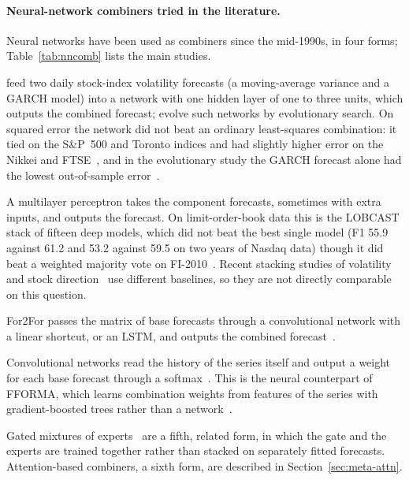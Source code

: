 \paragraph{Neural-network combiners tried in the literature.} Neural networks have been used as combiners
since the mid-1990s, in four forms; Table~\ref{tab:nncomb} lists the main studies.
\begin{description}[leftmargin=1.5em,style=nextline,itemsep=2pt]
\item[A small network on the forecasts alone] \citet{donaldson1996annc} feed two daily stock-index volatility
  forecasts (a moving-average variance and a GARCH model) into a network with one hidden layer of one to
  three units, which outputs the combined forecast; \citet{harrald1997} evolve such networks by evolutionary
  search. On squared error the network did not beat an ordinary least-squares combination: it tied on the
  S\&P~500 and Toronto indices and had slightly higher error on the Nikkei and FTSE~\citep{donaldson1996annc}, and
  in the evolutionary study the GARCH forecast alone had the lowest out-of-sample error~\citep{harrald1997}.
\item[A feed-forward stacker] A multilayer perceptron takes the component forecasts, sometimes with extra
  inputs, and outputs the forecast. On limit-order-book data this is the LOBCAST stack of fifteen deep
  models, which did not beat the best single model (F1 55.9 against 61.2 and 53.2 against 59.5 on two years of
  Nasdaq data) though it did beat a weighted majority vote on FI-2010~\citep{prata2024}. Recent stacking
  studies of volatility and stock direction~\citep{ramosperez2019,barnwal2019stack} use different
  baselines, so they are not directly comparable on this question.
\item[A network that reads the forecasts as a sequence or image] For2For passes the matrix of base forecasts
  through a convolutional network with a linear shortcut, or an LSTM, and outputs the combined
  forecast~\citep{zhao2020for2for}.
\item[A network that outputs weights from the raw series] Convolutional networks read the history of the
  series itself and output a weight for each base forecast through a softmax~\citep{mafildes2021,felici2026mtl}.
  This is the neural counterpart of FFORMA, which learns combination weights from features of the series with
  gradient-boosted trees rather than a network~\citep{montero2020fforma}.
\end{description}
Gated mixtures of experts~\citep{jacobs1991,guo2018btcvol} are a fifth, related form, in which the gate and
the experts are trained together rather than stacked on separately fitted forecasts. Attention-based combiners, a sixth form, are described in Section~\ref{sec:meta-attn}.

